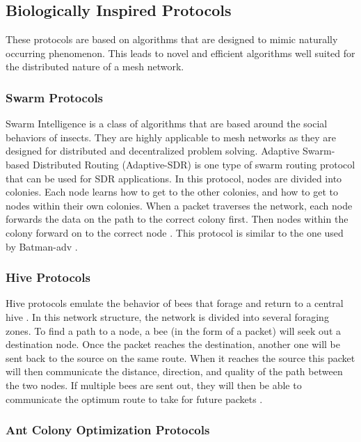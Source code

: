 \subsection{Biologically Inspired Protocols}

These protocols are based on algorithms that are designed to mimic naturally occurring phenomenon. This leads to novel and efficient algorithms well suited for the distributed nature of a mesh network.

\subsubsection{Swarm Protocols}

Swarm Intelligence is a class of algorithms that are based around the social behaviors of insects. They are highly applicable to mesh networks as they are designed for distributed and decentralized problem solving. Adaptive Swarm-based Distributed Routing (Adaptive-SDR) is one type of swarm routing protocol that can be used for SDR applications. In this protocol, nodes are divided into colonies. Each node learns how to get to the other colonies, and how to get to nodes within their own colonies. When a packet traverses the network, each node forwards the data on the path to the correct colony first. Then nodes within the colony forward on to the correct node \cite{1005496}. This protocol is similar to the one used by Batman-adv \cite{0033}.


\subsubsection{Hive Protocols}

Hive protocols emulate the behavior of bees that forage and return to a central hive \cite{6863008}. In this network structure, the network is divided into several foraging zones. To find a path to a node, a bee (in the form of a packet) will seek out a destination node. Once the packet reaches the destination, another one will be sent back to the source on the same route. When it reaches the source this packet will then communicate the distance, direction, and quality of the path between the two nodes. If multiple bees are sent out, they will then be able to communicate the optimum route to take for future packets \cite{7373160}. 

\subsubsection{Ant Colony Optimization Protocols}

